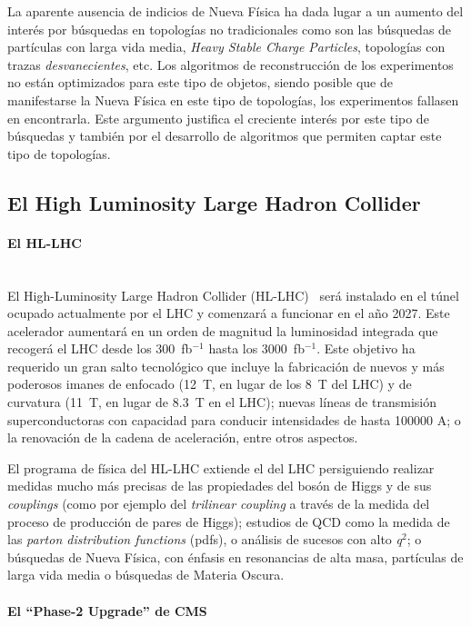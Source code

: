 La aparente ausencia de indicios de Nueva Física ha dada lugar a un aumento del interés por búsquedas en topologías no tradicionales como son las búsquedas de partículas con larga vida media, \emph{Heavy Stable Charge Particles}, topologías con trazas \emph{desvanecientes}, etc. Los algoritmos de reconstrucción de los experimentos no están optimizados para este tipo de objetos, siendo posible que de manifestarse la Nueva Física en este tipo de topologías, los experimentos fallasen en encontrarla. Este argumento justifica el creciente interés por este tipo de búsquedas y también por el desarrollo de algoritmos que permiten captar este tipo de topologías. 

\subsection{El High Luminosity Large Hadron Collider}

\paragraph{El HL-LHC\\\\}

El High-Luminosity Large Hadron Collider (HL-LHC)~\cite{HLLHC} será instalado en el túnel ocupado actualmente por el LHC y comenzará a funcionar en el año 2027. Este acelerador aumentará en un orden de magnitud la luminosidad integrada que recogerá el LHC desde los 300~fb$^{-1}$ hasta los 3000~fb$^{-1}$. Este objetivo ha requerido un gran salto tecnológico que incluye la fabricación de nuevos y más poderosos imanes de enfocado (12~T, en lugar de los 8~T del LHC) y de curvatura (11~T, en lugar de 8.3~T en el LHC); nuevas líneas de transmisión superconductoras con capacidad para conducir intensidades de hasta 100000 A; o la renovación de la cadena de aceleración, entre otros aspectos.

El programa de física del HL-LHC extiende el del LHC persiguiendo realizar medidas mucho más precisas de las propiedades del bosón de Higgs y de sus \emph{couplings} (como por ejemplo del \emph{trilinear coupling} a través de la medida del proceso de producción de pares de Higgs); estudios de QCD como la medida de las \emph{parton distribution functions} (pdfs), o análisis de sucesos con alto \emph{q$^2$}; o búsquedas de Nueva Física, con énfasis en resonancias de alta masa, partículas de larga vida media o búsquedas de Materia Oscura. 

\paragraph{El ``Phase-2 Upgrade'' de CMS\\\\}

